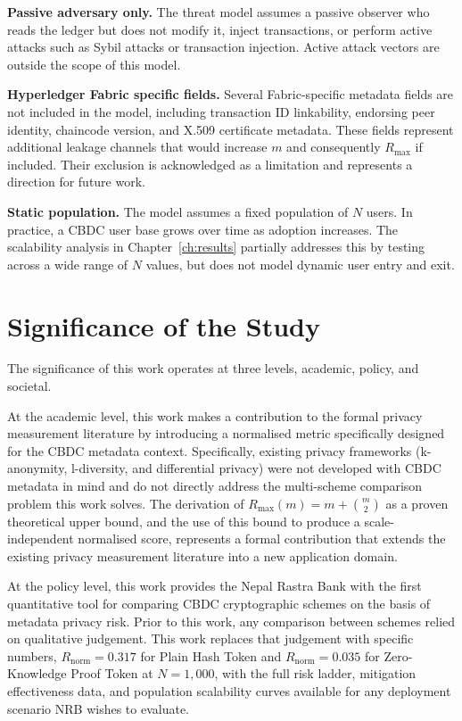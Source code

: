\textbf{Passive adversary only.} The threat model assumes
a passive observer who reads the ledger but does not
modify it, inject transactions, or perform active attacks
such as Sybil attacks or transaction injection. Active
attack vectors are outside the scope of this model.

\textbf{Hyperledger Fabric specific fields.} Several
Fabric-specific metadata fields are not included in the
model, including transaction ID linkability, endorsing
peer identity, chaincode version, and X.509 certificate
metadata. These fields represent additional leakage channels
that would increase $m$ and consequently $R_{\mathrm{max}}$
if included. Their exclusion is acknowledged as a limitation
and represents a direction for future work.

\textbf{Static population.} The model assumes a fixed
population of $N$ users. In practice, a CBDC user base
grows over time as adoption increases. The scalability
analysis in Chapter~\ref{ch:results} partially addresses
this by testing across a wide range of $N$ values, but
does not model dynamic user entry and exit.

\section{Significance of the Study}
\label{sec:significance}

The significance of this work operates at three levels,
academic, policy, and societal.

At the academic level, this work makes a contribution
to the formal privacy measurement literature by introducing
a normalised metric specifically designed for the CBDC
metadata context. Specifically, existing privacy frameworks (k-anonymity,
l-diversity, and differential privacy) were not developed
with CBDC metadata in mind and do not directly address the
multi-scheme comparison problem this work solves.
The derivation of $R_{\mathrm{max}}(m) = m + \binom{m}{2}$
as a proven theoretical upper bound, and the use of this
bound to produce a scale-independent normalised score,
represents a formal contribution that extends the existing
privacy measurement literature into a new application domain.

At the policy level, this work provides the Nepal Rastra
Bank with the first quantitative tool for comparing CBDC
cryptographic schemes on the basis of metadata privacy risk.
Prior to this work, any comparison between schemes relied
on qualitative judgement. This work replaces that
judgement with specific numbers, $R_{\mathrm{norm}} = 0.317$
for Plain Hash Token and $R_{\mathrm{norm}} = 0.035$ for
Zero-Knowledge Proof Token at $N = 1{,}000$, with the full risk ladder,
mitigation effectiveness data, and population scalability
curves available for any deployment scenario NRB wishes
to evaluate.

